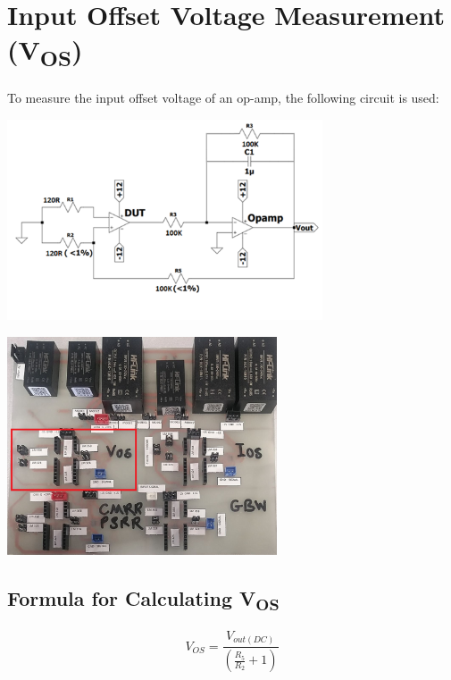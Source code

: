 \documentclass[a4paper,12pt]{article}
\begin{document}
\vspace{1em}

\section{Input Offset Voltage Measurement (V\textsubscript{OS})}

To measure the input offset voltage of an op-amp, the following circuit is used:

\begin{center}
  \includegraphics[width=0.7\textwidth]{IMAGEs/vos_test_circuit.png}
\end{center}

\begin{center}
  \includegraphics[width=0.6\textwidth]{IMAGEs/vos_test_device.png}
\end{center}

\subsection*{Formula for Calculating V\textsubscript{OS}}

\begin{equation}
V_{OS} = \frac{V_{out(DC)}}{\left(\frac{R_5}{R_2} + 1\right)}
\end{equation}
\end{document}
